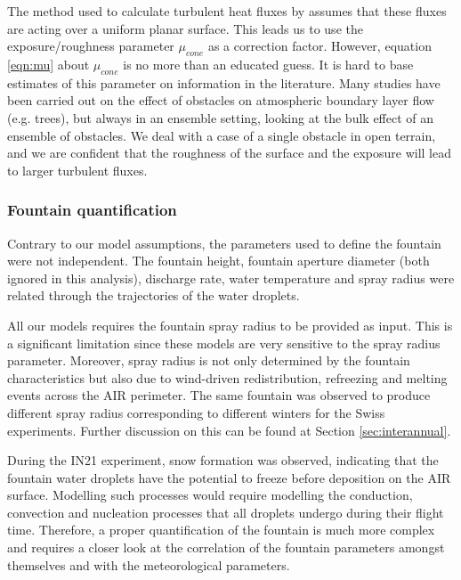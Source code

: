 
The method used to calculate turbulent heat fluxes by \citet{garrattAtmosphericBoundaryLayer1992} assumes that
these fluxes are acting over a uniform planar surface. This leads us to use the exposure/roughness parameter
$\mu_{cone}$ as a correction factor. However, equation \ref{eqn:mu} about $\mu_{cone}$ is no more than an educated guess. It
is hard to base estimates of this parameter on information in the literature. Many studies have been carried out
on the effect of obstacles on atmospheric boundary layer flow (e.g. trees), but always in an ensemble setting,
looking at the bulk effect of an ensemble of obstacles. We deal with a case of a single obstacle in open
terrain, and we are confident that the roughness of the surface and the exposure will lead to larger turbulent
fluxes.

\subsubsection{Fountain quantification}

Contrary to our model assumptions, the parameters used to define the fountain were not independent. The fountain
height, fountain aperture diameter (both ignored in this analysis), discharge rate, water temperature and spray
radius were related through the trajectories of the water droplets.

All our models requires the fountain spray radius to be provided as input. This is a significant limitation
since these models are very sensitive to the spray radius parameter. Moreover, spray radius is not only determined
by the fountain characteristics but also due to wind-driven redistribution, refreezing and melting events across
the AIR perimeter. The same fountain was observed to produce different spray radius corresponding to different
winters for the Swiss experiments. Further discussion on this can be found at Section \ref{sec:interannual}.


During the IN21 experiment, snow formation was observed, indicating that the fountain water droplets have the
potential to freeze before deposition on the AIR surface. Modelling such processes would require modelling the
conduction, convection and nucleation processes that all droplets undergo during their flight time. Therefore, a
proper quantification of the fountain is much more complex and requires a closer look at the correlation of the
fountain parameters amongst themselves and with the meteorological parameters.


